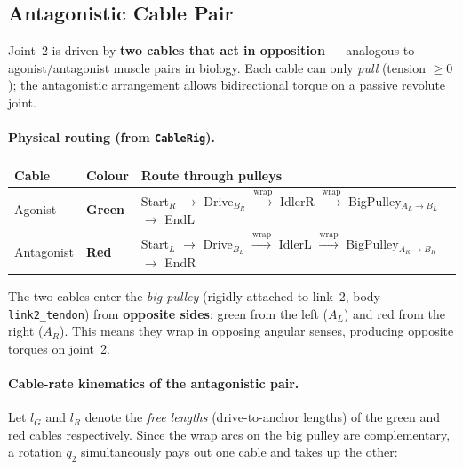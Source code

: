 \documentclass[12pt, a4paper]{article}
\theoremstyle{definition}
\begin{document}
\subsection{Antagonistic Cable Pair}
\label{sec:antagonistic}

Joint~2 is driven by \textbf{two cables that act in opposition} --- analogous to
agonist/antagonist muscle pairs in biology.  Each cable can only \emph{pull}
(tension $\ge 0$); the antagonistic arrangement allows bidirectional torque on a
passive revolute joint.

\paragraph{Physical routing (from \texttt{CableRig}).}
\begin{center}
\renewcommand{\arraystretch}{1.3}
\begin{tabular}{lll}
  \toprule
  Cable & Colour & Route through pulleys \\
  \midrule
  Agonist   & \textbf{Green} &
    Start$_R$ $\to$ Drive$_{B_R}$ $\xrightarrow{\text{wrap}}$ IdlerR
    $\xrightarrow{\text{wrap}}$ BigPulley$_{A_L \to B_L}$ $\to$ EndL \\
  Antagonist & \textbf{Red} &
    Start$_L$ $\to$ Drive$_{B_L}$ $\xrightarrow{\text{wrap}}$ IdlerL
    $\xrightarrow{\text{wrap}}$ BigPulley$_{A_R \to B_R}$ $\to$ EndR \\
  \bottomrule
\end{tabular}
\end{center}

The two cables enter the \emph{big pulley} (rigidly attached to link~2,
body \texttt{link2\_tendon}) from \textbf{opposite sides}: green from the left
($A_L$) and red from the right ($A_R$).  This means they wrap in opposing angular
senses, producing opposite torques on joint~2.

\paragraph{Cable-rate kinematics of the antagonistic pair.}
Let $l_G$ and $l_R$ denote the \emph{free lengths} (drive-to-anchor lengths) of
the green and red cables respectively.  Since the wrap arcs on the big pulley are
complementary, a rotation $\dot{q}_2$ simultaneously pays out one cable and takes
up the other:
\end{document}
